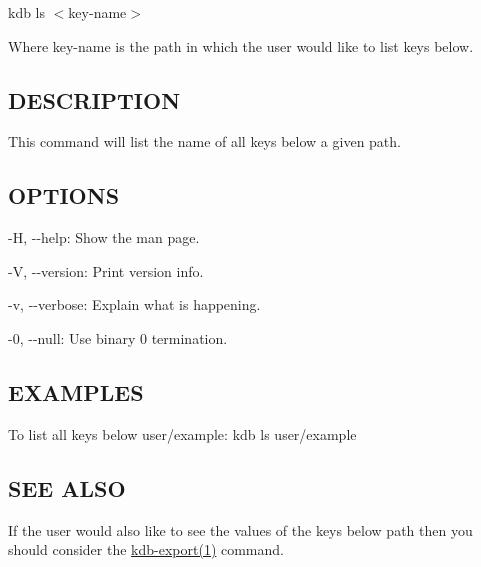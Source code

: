 {\ttfamily kdb ls $<$key-\/name$>$}

Where {\ttfamily key-\/name} is the path in which the user would like to list keys below.

\subsection*{D\+E\+S\+C\+R\+I\+P\+T\+I\+O\+N}

This command will list the name of all keys below a given path.

\subsection*{O\+P\+T\+I\+O\+N\+S}


\begin{DoxyItemize}
\item {\ttfamily -\/\+H}, {\ttfamily -\/-\/help}\+: Show the man page.
\item {\ttfamily -\/\+V}, {\ttfamily -\/-\/version}\+: Print version info.
\item {\ttfamily -\/v}, {\ttfamily -\/-\/verbose}\+: Explain what is happening.
\item {\ttfamily -\/0}, {\ttfamily -\/-\/null}\+: Use binary 0 termination.
\end{DoxyItemize}

\subsection*{E\+X\+A\+M\+P\+L\+E\+S}

To list all keys below {\ttfamily user/example}\+: {\ttfamily kdb ls user/example}

\subsection*{S\+E\+E A\+L\+S\+O}

If the user would also like to see the values of the keys below {\ttfamily path} then you should consider the \hyperlink{md_doc_help_kdb-export_doc_help_kdb-export_md}{kdb-\/export(1)} command. 